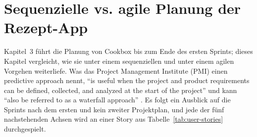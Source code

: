 \section{Sequenzielle vs. agile Planung der Rezept-App}

%
%
Kapitel~3 führt die Planung von Cookbox bis zum Ende des ersten Sprints; dieses
Kapitel vergleicht, wie sie unter einem sequenziellen und unter einem agilen
Vorgehen weiterliefe. Was das Project Management Institute (PMI) einen predictive
approach nennt, \enquote{is useful when the project and product requirements can be
defined, collected, and analyzed at the start of the project} und kann
\enquote{also be referred to as a waterfall
approach} \parencite[PMBOK Guide, Section~2.3.3]{pmbok2021}. Es folgt ein
Ausblick auf die Sprints nach dem ersten und kein zweiter Projektplan, und jede
der fünf nachstehenden Achsen wird an einer Story aus
Tabelle~\ref{tab:user-stories} durchgespielt.

